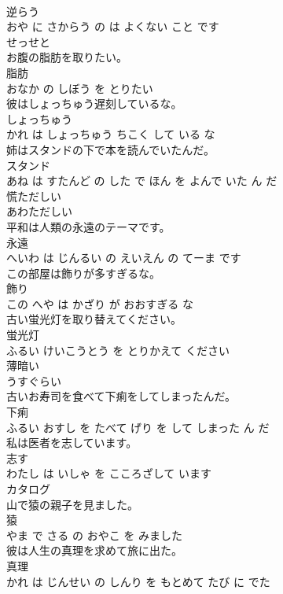 \documentclass[8pt]{extreport}
\begin{document}
\begin{CJK}{UTF8}{min}
\\	逆らう 
\\	おや に さからう の は よくない こと です			
\\	せっせと	
\\	お腹の脂肪を取りたい。	
\\	脂肪 
\\	おなか の しぼう を とりたい			
\\	彼はしょっちゅう遅刻しているな。	
\\	しょっちゅう 
\\	かれ は しょっちゅう ちこく して いる な			
\\	姉はスタンドの下で本を読んでいたんだ。	
\\	スタンド 
\\	あね は すたんど の した で ほん を よんで いた ん だ			
\\	慌ただしい	
\\	あわただしい			
\\	平和は人類の永遠のテーマです。	
\\	永遠 
\\	へいわ は じんるい の えいえん の てーま です			
\\	この部屋は飾りが多すぎるな。	
\\	飾り 
\\	この へや は かざり が おおすぎる な			
\\	古い蛍光灯を取り替えてください。	
\\	蛍光灯 
\\	ふるい けいこうとう を とりかえて ください			
\\	薄暗い	
\\	うすぐらい			
\\	古いお寿司を食べて下痢をしてしまったんだ。	
\\	下痢 
\\	ふるい おすし を たべて げり を して しまった ん だ			
\\	私は医者を志しています。	
\\	志す 
\\	わたし は いしゃ を こころざして います			
\\	カタログ	
\\	山で猿の親子を見ました。	
\\	猿 
\\	やま で さる の おやこ を みました			
\\	彼は人生の真理を求めて旅に出た。	
\\	真理 
\\	かれ は じんせい の しんり を もとめて たび に でた			

\end{CJK}
\end{document}

